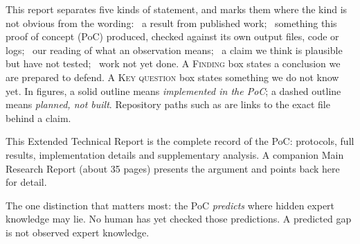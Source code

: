 \documentclass[a4paper,11pt]{scrartcl}
\begin{document}
\begin{howtoreadbox}
  This report separates five kinds of statement, and marks them where the
  kind is not obvious from the wording:
  \evlit\ a result from published work;
  \evobs\ something this proof of concept (PoC) produced, checked against
    its own output files, code or logs;
  \evint\ our reading of what an observation means;
  \evhyp\ a claim we think is plausible but have not tested;
  \evfut\ work not yet done.
  A \textsc{Finding} box states a conclusion we are prepared to defend. A
  \textsc{Key question} box states something we do not know yet.
  In figures, a solid outline means \emph{implemented in the PoC}; a
  dashed outline means \emph{planned, not built}.
  Repository paths such as  are links to the
  exact file behind a claim.

  \smallskip
  This Extended Technical Report is the complete record of the PoC: protocols,
  full results, implementation details and supplementary analysis. A
  companion Main Research Report (about 35 pages) presents the argument and
  points back here for detail.

  \smallskip
  The one distinction that matters most: the PoC \emph{predicts} where
  hidden expert knowledge may lie. No human has yet checked those
  predictions. A predicted gap is not observed expert knowledge.
\end{howtoreadbox}

\setcounter{tocdepth}{1}
\tableofcontents

\clearpage
{}



















\end{document}
